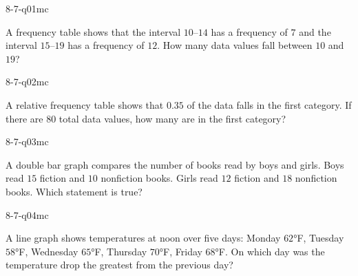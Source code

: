 

\begin{practiceQuestion}{8-7-q01}{mc}
\begin{questionText}
A frequency table shows that the interval $10$--$14$ has a frequency of $7$ and the interval $15$--$19$ has a frequency of $12$. How many data values fall between $10$ and $19$?
\end{questionText}
\end{practiceQuestion}

\begin{practiceQuestion}{8-7-q02}{mc}
\begin{questionText}
A relative frequency table shows that $0.35$ of the data falls in the first category. If there are $80$ total data values, how many are in the first category?
\end{questionText}
\end{practiceQuestion}

\begin{practiceQuestion}{8-7-q03}{mc}
\begin{questionText}
A double bar graph compares the number of books read by boys and girls. Boys read $15$ fiction and $10$ nonfiction books. Girls read $12$ fiction and $18$ nonfiction books. Which statement is true?
\end{questionText}
\end{practiceQuestion}

\begin{practiceQuestion}{8-7-q04}{mc}
\begin{questionText}
A line graph shows temperatures at noon over five days: Monday $62°$F, Tuesday $58°$F, Wednesday $65°$F, Thursday $70°$F, Friday $68°$F. On which day was the temperature drop the greatest from the previous day?
\end{questionText}
\end{practiceQuestion}

